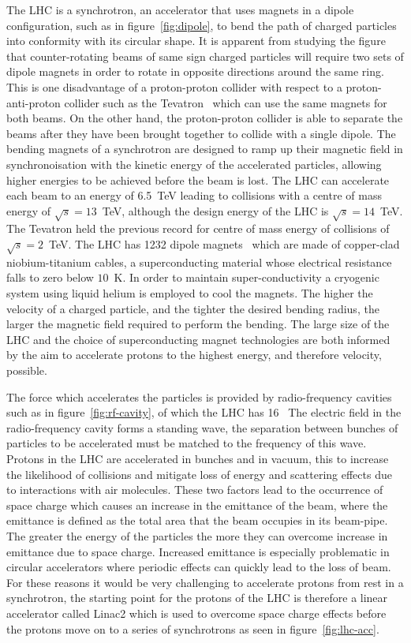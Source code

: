 The LHC is a synchrotron, an accelerator that uses magnets in a dipole
configuration, such as in figure~\ref{fig:dipole}, to bend the path of charged
particles into conformity with its circular shape. It is apparent from studying
the figure that counter-rotating beams of same sign charged particles will
require two sets of dipole magnets in order to rotate in opposite directions
around the same ring. This is one disadvantage of a proton-proton collider with
respect to a proton-anti-proton collider such as the Tevatron~\cite{tevatron-01}
which can use the same magnets for both beams. On the other hand, the
proton-proton collider is able to separate the beams after they have been
brought together to collide with a single dipole. The bending magnets of a
synchrotron are designed to ramp up their magnetic field in synchronoisation
with the kinetic energy of the accelerated particles, allowing higher energies
to be achieved before the beam is lost. The LHC can accelerate each beam to an
energy of 6.5~TeV leading to collisions with a centre of mass energy of
$\sqrt{s} = 13 $~TeV, although the design energy of the LHC is $\sqrt{s} = 14
$~TeV. The Tevatron held the previous record for centre of mass energy of
collisions of $\sqrt{s} = 2 $~TeV. The LHC has 1232 dipole magnets~\cite{LHC-dr}
which are made of copper-clad niobium-titanium cables, a superconducting
material whose electrical resistance falls to zero below $10$~K. In order to
maintain super-conductivity a cryogenic system using liquid helium is employed
to cool the magnets. The higher the velocity of a charged particle, and the
tighter the desired bending radius, the larger the magnetic field required to
perform the bending. The large size of the LHC and the choice of superconducting
magnet technologies are both informed by the aim to accelerate protons to the
highest energy, and therefore velocity, possible.


The force which accelerates the particles is provided by radio-frequency
cavities such as in figure~\ref{fig:rf-cavity}, of which the LHC has
16~\cite{LHC-dr} The electric field in the radio-frequency cavity forms a
standing wave, the separation between bunches of particles to be accelerated
must be matched to the frequency of this wave. Protons in the LHC are
accelerated in bunches and in vacuum, this to increase the likelihood of
collisions and mitigate loss of energy and scattering effects due to
interactions with air molecules. These two factors lead to the occurrence of
space charge which causes an increase in the emittance of the beam, where the
emittance is defined as the total area that the beam occupies in its beam-pipe.
The greater the energy of the particles the more they can overcome increase in
emittance due to space charge. Increased emittance is especially problematic in
circular accelerators where periodic effects can quickly lead to the loss of
beam. For these reasons it would be very challenging to accelerate protons from
rest in a synchrotron, the starting point for the protons of the LHC is
therefore a linear accelerator called Linac2 which is used to overcome space
charge effects before the protons move on to a series of synchrotrons as seen in
figure~\ref{fig:lhc-acc}.


